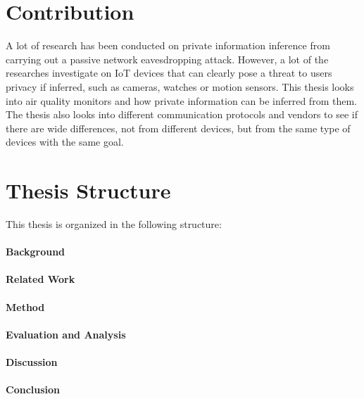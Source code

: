 \section{Contribution}
A lot of research has been conducted on private information inference from carrying out a passive network eavesdropping attack. However, a lot of the researches investigate on IoT devices that can clearly pose a threat to users privacy if inferred, such as cameras, watches or motion sensors. This thesis looks into air quality monitors and how private information can be inferred from them. The thesis also looks into different communication protocols and vendors to see if there are wide differences, not from different devices, but from the same type of devices with the same goal. 

\section{Thesis Structure}
This thesis is organized in the following structure:\\\\
\textbf{Background}
\\\\
\textbf{Related Work}
\\\\
\textbf{Method}
\\\\
\textbf{Evaluation and Analysis}
\\\\
\textbf{Discussion}
\\\\
\textbf{Conclusion}